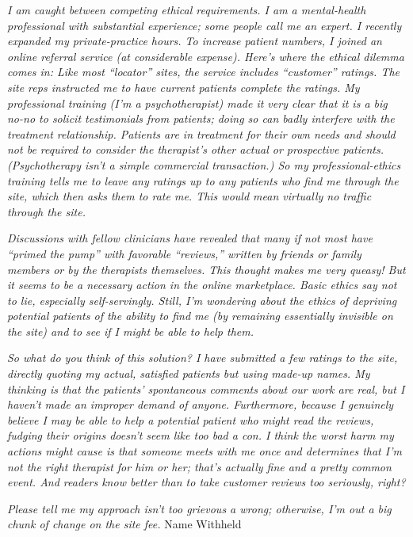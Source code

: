 \emph{I am caught between competing ethical requirements. I am a
mental-health professional with substantial experience; some people call
me an expert. I recently expanded my private-practice hours. To increase
patient numbers, I joined an online referral service (at considerable
expense). Here's where the ethical dilemma comes in: Like most
``locator'' sites, the service includes ``customer'' ratings. The site
reps instructed me to have current patients complete the ratings. My
professional training (I'm a psychotherapist) made it very clear that it
is a big no-no to solicit testimonials from patients; doing so can badly
interfere with the treatment relationship. Patients are in treatment for
their own needs and should not be required to consider the therapist's
other actual or prospective patients. (Psychotherapy isn't a simple
commercial transaction.) So my professional-ethics training tells me to
leave any ratings up to any patients who find me through the site, which
then asks them to rate me. This would mean virtually no traffic through
the site.}

\emph{Discussions with fellow clinicians have revealed that many if not
most have ``primed the pump'' with favorable ``reviews,'' written by
friends or family members or by the therapists themselves. This thought
makes me very queasy! But it seems to be a necessary action in the
online marketplace. Basic ethics say not to lie, especially
self-servingly. Still, I'm wondering about the ethics of depriving
potential patients of the ability to find me (by remaining essentially
invisible on the site) and to see if I might be able to help them.}

\emph{So what do you think of this solution? I have submitted a few
ratings to the site, directly quoting my actual, satisfied patients but
using made-up names. My thinking is that the patients' spontaneous
comments about our work are real, but I haven't made an improper demand
of anyone. Furthermore, because I genuinely believe I may be able to
help a potential patient who might read the reviews, fudging their
origins doesn't seem like too bad a con. I think the worst harm my
actions might cause is that someone meets with me once and determines
that I'm not the right therapist for him or her; that's actually fine
and a pretty common event. And readers know better than to take customer
reviews too seriously, right?}

\emph{Please tell me my approach isn't too grievous a wrong; otherwise,
I'm out a big chunk of change on the site fee.} Name Withheld

